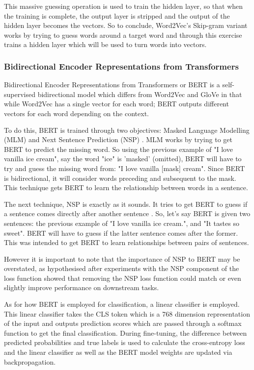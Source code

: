 \documentclass[stu,12pt,floatsintext,donotrepeattitle]{apa7}
\begin{document}
This massive guessing operation is used to train the hidden layer, so that when the training is complete, the output layer is stripped and the output of the hidden layer becomes the vectors. So to conclude, Word2Vec's Skip-gram variant works by trying to guess words around a target word and through this exercise trains a hidden layer which will be used to turn words into vectors. 

\subsubsection{Bidirectional Encoder Representations from Transformers}
Bidirectional Encoder Representations from Transformers or BERT is a self-supervised bidirectional model which differs from Word2Vec and GloVe in that while Word2Vec has a single vector for each word; BERT outputs different vectors for each word depending on the context. 

To do this, BERT is trained through two objectives: Masked Language Modelling (MLM) and Next Sentence Prediction (NSP) \parencite{roberta}. MLM works by trying to get BERT to predict the missing word. So using the previous example of "I love vanilla ice cream", say the word "ice" is 'masked' (omitted), BERT will have to try and guess the missing word from: "I love vanilla [mask] cream". Since BERT is bidirectional, it will consider words preceding and subsequent to the mask. This technique gets BERT to learn the relationship between words in a sentence. 

The next technique, NSP is exactly as it sounds. It tries to get BERT to guess if a sentence comes directly after another sentence \parencite{roberta}. So, let's say BERT is given two sentences: the previous example of "I love vanilla ice cream.", and "It tastes so sweet". BERT will have to guess if the latter sentence comes after the former. This was intended to get BERT to learn relationships between pairs of sentences.

However it is important to note that the importance of NSP to BERT may be overstated, as \textcite{roberta} hypothesised after experiments with the NSP component of the loss function showed that removing the NSP loss function could match or even slightly improve performance on downstream tasks. 

As for how BERT is employed for classification, a linear classifier is employed. This linear classifier takes the CLS token which is a 768 dimension representation of the input and outputs prediction scores which are passed through a softmax function to get the final classification. During fine-tuning, the difference between predicted probabilities and true labels is used to calculate the cross-entropy loss and the linear classifier as well as the BERT model weights are updated via backpropagation. 
\end{document}

